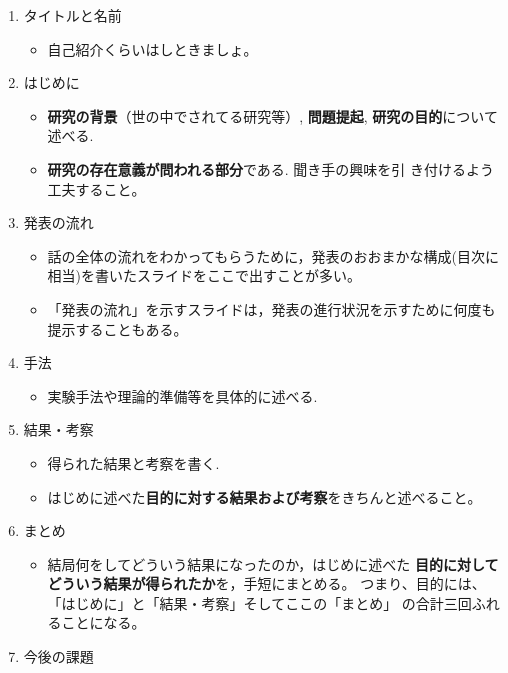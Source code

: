 \documentclass[12pt, ]{jsarticle}
\providecommand{\tightlist}{%
   \setlength{\itemsep}{0pt}\setlength{\parskip}{0pt}}
\begin{document}
\begin{enumerate}
\item
  タイトルと名前

  \begin{itemize}
  \tightlist
  \item
    自己紹介くらいはしときましょ。
  \end{itemize}
\item
  はじめに

  \begin{itemize}
  \item
    \textbf{研究の背景}（世の中でされてる研究等）, \textbf{問題提起},
    \textbf{研究の目的}について述べる.
  \item
    \textbf{研究の存在意義が問われる部分}である. 聞き手の興味を引
    き付けるよう工夫すること。
  \end{itemize}
\item
  発表の流れ

  \begin{itemize}
  \tightlist
  \item
    話の全体の流れをわかってもらうために，発表のおおまかな構成(目次に相当)を書いたスライドをここで出すことが多い。
  \item
    「発表の流れ」を示すスライドは，発表の進行状況を示すために何度も提示することもある。
  \end{itemize}
\item
  手法

  \begin{itemize}
  \tightlist
  \item
    実験手法や理論的準備等を具体的に述べる.
  \end{itemize}
\item
  結果・考察

  \begin{itemize}
  \item
    得られた結果と考察を書く.
  \item
    はじめに述べた\textbf{目的に対する結果および考察}をきちんと述べること。
  \end{itemize}
\item
  まとめ

  \begin{itemize}
  \tightlist
  \item
    結局何をしてどういう結果になったのか，はじめに述べた
    \textbf{目的に対してどういう結果が得られたか}を，手短にまとめる。
    つまり、目的には、「はじめに」と「結果・考察」そしてここの「まとめ」
    の合計三回ふれることになる。
  \end{itemize}
\item
  今後の課題


\end{enumerate}
\end{document}
